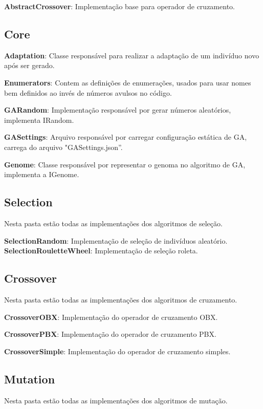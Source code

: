 \textbf{AbstractCrossover}: Implementação base para operador de cruzamento.

\subsection{Core}

\textbf{Adaptation}: Classe responsável para realizar a adaptação de um indivíduo novo após ser gerado.

\textbf{Enumerators}: Contem as definições de enumerações, usados para usar nomes bem definidos ao invés de números avulsos no código.

\textbf{GARandom}: Implementação responsável por gerar números aleatórios, implementa IRandom.

\textbf{GASettings}: Arquivo responsável por carregar configuração estática de GA, carrega do arquivo "GASettings.json”.

\textbf{Genome}: Classe responsável por representar o genoma no algoritmo de GA, implementa a IGenome.


\subsection{Selection}

Nesta pasta estão todas as implementações dos algoritmos de seleção.

\textbf{SelectionRandom}: Implementação de seleção de indivíduos aleatório.
\textbf{SelectionRouletteWheel}: Implementação de seleção roleta.

\subsection{Crossover}

Nesta pasta estão todas as implementações dos algoritmos de cruzamento.

\textbf{CrossoverOBX}: Implementação do operador de cruzamento OBX.

\textbf{CrossoverPBX}: Implementação do operador de cruzamento PBX.

\textbf{CrossoverSimple}:  Implementação do operador de cruzamento simples.

\subsection{Mutation}

Nesta pasta estão todas as implementações dos algoritmos de mutação.

